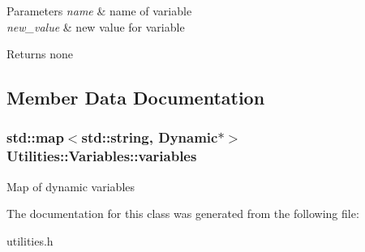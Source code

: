 \begin{DoxyParams}{Parameters}
{\em name} & name of variable \\
\hline
{\em new\+\_\+value} & new value for variable \\
\hline
\end{DoxyParams}
\begin{DoxyReturn}{Returns}
none 
\end{DoxyReturn}


\subsection{Member Data Documentation}
\subsubsection[{\texorpdfstring{variables}{variables}}]{\setlength{\rightskip}{0pt plus 5cm}std\+::map$<$std\+::string, {\bf Dynamic}$\ast$$>$ Utilities\+::\+Variables\+::variables\hspace{0.3cm}{\ttfamily [protected]}}\hypertarget{classUtilities_1_1Variables_acd0a2a9ec3135923b460cdf4e571d478}{}\label{classUtilities_1_1Variables_acd0a2a9ec3135923b460cdf4e571d478}
Map of dynamic variables 

The documentation for this class was generated from the following file\+:\begin{DoxyCompactItemize}
\item 
utilities.\+h\end{DoxyCompactItemize}
